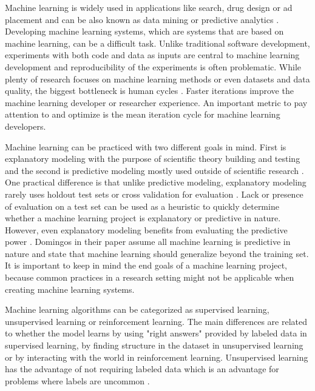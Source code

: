 Machine learning is widely used in applications like search, drug design or ad placement and can be also known as data mining or predictive analytics \parencite{domingosFewUsefulThings2012}. Developing machine learning systems, which are systems that are based on machine learning, can be a difficult task. Unlike traditional software development, experiments with both code and data as inputs are central to machine learning development \parencite{zahariaAcceleratingMachineLearning2018} and reproducibility of the experiments is often problematic. While plenty of research focuses on machine learning methods or even datasets and data quality, the biggest bottleneck is human cycles \parencite{domingosFewUsefulThings2012}. Faster iterations improve the machine learning developer or researcher experience. An important metric to pay attention to and optimize is the mean iteration cycle for machine learning developers.

Machine learning can be practiced with two different goals in mind. First is explanatory modeling with the purpose of scientific theory building and testing and the second is predictive modeling mostly used outside of scientific research \parencite{shmueliExplainPredict2010a}.
One practical difference is that unlike predictive modeling, explanatory modeling rarely uses holdout test sets or cross validation for evaluation \parencite{shmueliExplainPredict2010a}.
Lack or presence of evaluation on a test set can be used as a heuristic to quickly determine whether a machine learning project is explanatory or predictive in nature.
However, even explanatory modeling benefits from evaluating the predictive power \parencite{shmueliExplainPredict2010a}.
Domingos \parencite*{domingosFewUsefulThings2012} in their paper assume all machine learning is predictive in nature and state that machine learning should generalize beyond the training set.
It is important to keep in mind the end goals of a machine learning project, because common practices in a research setting might not be applicable when creating machine learning systems.

Machine learning algorithms can be categorized as supervised learning, unsupervised learning or reinforcement learning. %
The main differences are related to whether the model learns by using "right answers" provided by labeled data in supervised learning, by finding structure in the dataset in unsupervised learning or by interacting with the world in reinforcement learning. %
Unsupervised learning has the advantage of not requiring labeled data which is an advantage for problems where labels are uncommon \parencite{leBuildingHighlevelFeatures2012}.


